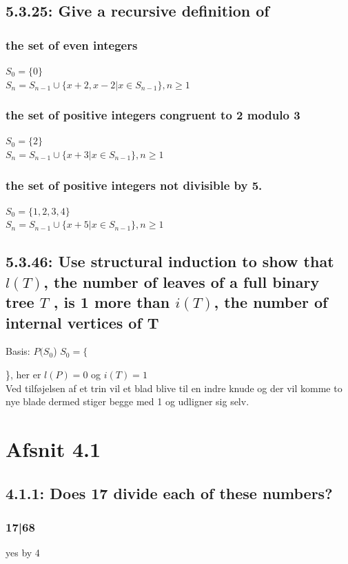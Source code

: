 \documentclass[12pt, a4paper]{report}
\begin{document}
				\subsection{5.3.25: Give a recursive definition of}
					\subsubsection{the set of even integers}
						$S_0 = \{0\}$\\
						$S_n=S_{n-1}\cup\{x+2,x-2|x\in S_{n-1}\},n\geq 1$
					\subsubsection{the set of positive integers congruent to 2 modulo 3}
						$S_0 = \{2\}$\\
						$S_n=S_{n-1}\cup\{x+3|x\in S_{n-1}\},n\geq 1$
					\subsubsection{the set of positive integers not divisible by 5.}
						$S_0 = \{1,2,3,4\}$\\
						$S_n=S_{n-1}\cup\{x+5|x\in S_{n-1}\},n\geq 1$
				\setcounter{subsection}{45}
				\subsection{5.3.46: Use structural induction to show that $l(T)$, the number of leaves of a full binary tree $T$ , is 1 more than $i(T )$, the number of internal vertices of T }
				Basis: $P(S_0$) $S_0=\{$\}, her er $l(P)=0$ og $i(T)=1$\\
						Ved tilføjelsen af et trin vil et blad blive til en indre knude og der vil komme to nye blade dermed stiger begge med 1 og udligner sig selv.
			\section{Afsnit 4.1}
				\setcounter{subsection}{0}
				\subsection{4.1.1: Does 17 divide each of these numbers?}
					\subsubsection{17|68}
						 yes by 4
\end{document}

